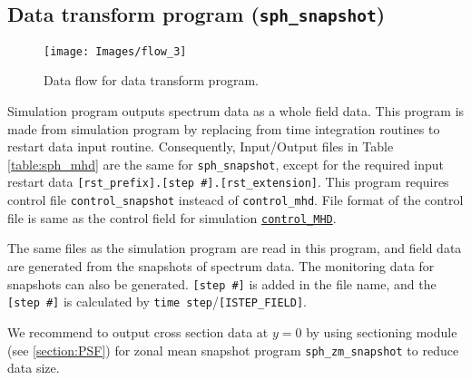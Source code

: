 \subsection{Data transform program ({\tt sph\_snapshot})}
\label{section:sph_snapshot}
%
\begin{figure}[htbp]
\begin{center}
\texttt{[image: Images/flow\_3]}
\end{center}
\caption{Data flow for data transform program.}
\label{fig:flow_3}
\end{figure}
%
Simulation program outputs spectrum data as a whole field data. This program is made from simulation program by replacing from time integration routines to restart data input routine. Consequently, Input/Output files in Table \ref{table:sph_mhd} are the same for {\tt sph\_snapshot}, except for the required input restart data \verb|[rst_prefix].[step #].[rst_extension]|.
%
This program requires control file \verb|control_snapshot| insteacd of \verb|control_mhd|. File format of the control file is same as the control field for simulation \hyperref[href_i:MHD_control]{\tt control\_MHD}.

The same files as the simulation program are read in this program, and field data are generated from the snapshots of spectrum data. The monitoring data for snapshots can also be generated. \verb|[step #]| is added in the file name, and the \verb|[step #]| is calculated by \verb|time step|/\verb|[ISTEP_FIELD]|.

We recommend to output cross section data at $y = 0$ by using sectioning module (see \ref{section:PSF}) for zonal mean snapshot program \verb|sph_zm_snapshot| to reduce data size.

\newpage

